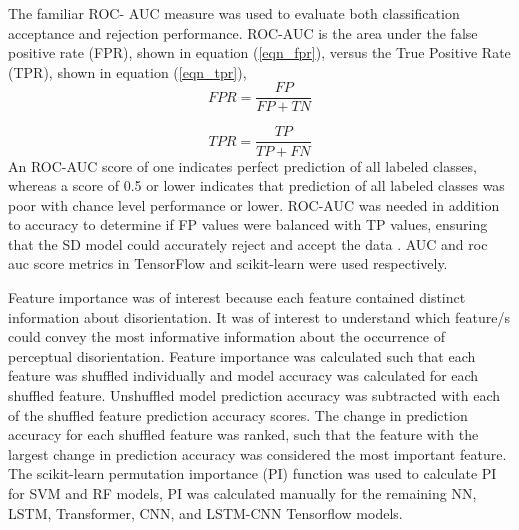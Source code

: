 \documentclass{ieeeaccess}
\begin{document}
The familiar ROC- AUC measure was used to evaluate both classification acceptance and rejection performance. ROC-AUC is the area under the false positive rate (FPR), shown in equation (\ref{eqn_fpr}), versus the True Positive Rate (TPR), shown in equation (\ref{eqn_tpr}),
\begin{equation}
FPR = \frac{FP}{FP+TN}
\label{eqn_fpr}
\end{equation}

\begin{equation}
TPR = \frac{TP}{TP+FN}
\label{eqn_tpr}
\end{equation}
\noindent An ROC-AUC score of one indicates perfect prediction of all labeled classes, whereas a score of 0.5 or lower indicates that prediction of all labeled classes was poor with chance level performance or lower. ROC-AUC was needed in addition to accuracy to determine if FP values were balanced with TP values, ensuring that the SD model could accurately reject and accept the data \cite{Burkov_2019_ML}. AUC and roc auc score metrics in TensorFlow and scikit-learn were used respectively.

Feature importance was of interest because each feature contained distinct information about disorientation. It was of interest to understand which feature/s could convey the most informative information about the occurrence of perceptual disorientation. Feature importance was calculated such that each feature was shuffled individually and model accuracy was calculated for each shuffled feature. Unshuffled model prediction accuracy was subtracted with each of the shuffled feature prediction accuracy scores. The change in prediction accuracy for each shuffled feature was ranked, such that the feature with the largest change in prediction accuracy was considered the most important feature. The scikit-learn permutation importance (PI) function was used to calculate PI for SVM and RF models, PI was calculated manually for the remaining NN, LSTM, Transformer, CNN, and LSTM-CNN Tensorflow models.
\end{document}
